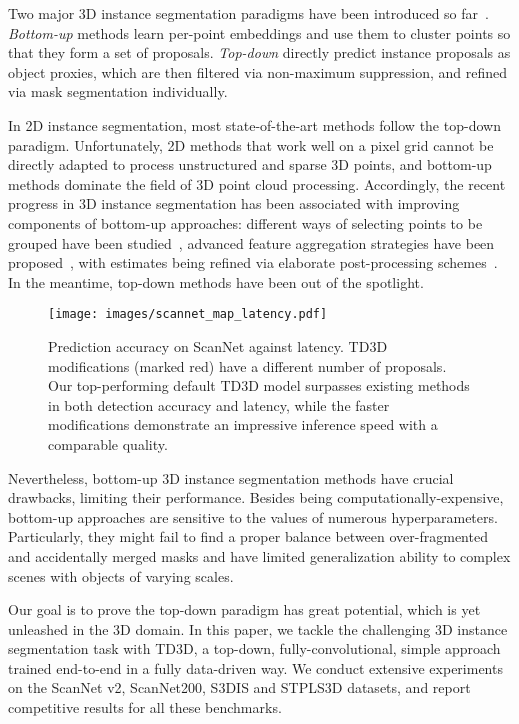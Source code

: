 \documentclass[10pt,twocolumn,letterpaper]{article}
\begin{document}
Two major 3D instance segmentation paradigms have been introduced so far~\cite{sun2022neuralbf}. \textit{Bottom-up} methods learn per-point embeddings and use them to cluster points so that they form a set of proposals. \textit{Top-down} directly predict instance proposals as object proxies, which are then filtered via non-maximum suppression, and refined via mask segmentation individually. 

In 2D instance segmentation, most state-of-the-art methods follow the top-down paradigm. Unfortunately, 2D methods that work well on a pixel grid cannot be directly adapted to process unstructured and sparse 3D points, and bottom-up methods dominate the field of 3D point cloud processing. Accordingly, the recent progress in 3D instance segmentation has been associated with improving components of bottom-up approaches: different ways of selecting points to be grouped have been studied~\cite{he2021dyco3d}, advanced feature aggregation strategies have been proposed~\cite{chen2021hierarchical, liang2021instance}, with estimates being refined via elaborate post-processing schemes~\cite{jiang2020pointgroup, vu2022softgroup}. In the meantime, top-down methods have been out of the spotlight. 

\begin{figure}[t!]
    \centering
    \texttt{[image: images/scannet\_map\_latency.pdf]}
    \caption{Prediction accuracy on ScanNet against latency. TD3D modifications (marked red) have a different number of proposals. Our top-performing default TD3D model surpasses existing methods in both detection accuracy and latency, while the faster modifications demonstrate an impressive inference speed with a comparable quality.}
    \label{fig:teaser}
\end{figure}

Nevertheless, bottom-up 3D instance segmentation methods have crucial drawbacks, limiting their performance. Besides being computationally-expensive, bottom-up approaches are sensitive to the values of numerous hyperparameters. Particularly, they might fail to find a proper balance between over-fragmented and accidentally merged masks and have limited generalization ability to complex scenes with objects of varying scales.

Our goal is to prove the top-down paradigm has great potential, which is yet unleashed in the 3D domain. In this paper, we tackle the challenging 3D instance segmentation task with TD3D, a top-down, fully-convolutional, simple approach trained end-to-end in a fully data-driven way. We conduct extensive experiments on the ScanNet v2, ScanNet200, S3DIS and STPLS3D datasets, and report competitive results for all these benchmarks.
\end{document}
